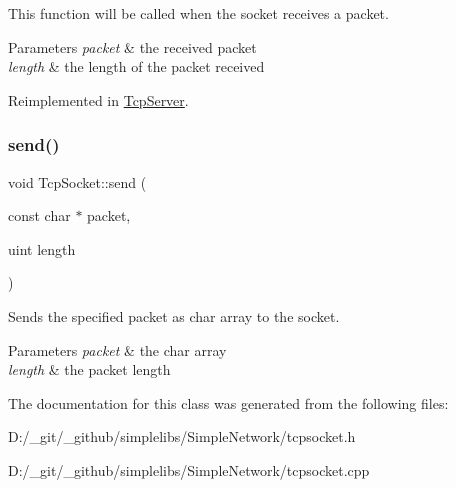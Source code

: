 This function will be called when the socket receives a packet. 


\begin{DoxyParams}{Parameters}
{\em packet} & the received packet \\
\hline
{\em length} & the length of the packet received \\
\hline
\end{DoxyParams}


Reimplemented in \mbox{\hyperlink{class_tcp_server_afb492b671a8960d2969f22a3c9408ba7}{Tcp\+Server}}.

\mbox{\label{class_tcp_socket_a9e62b6ef15b2e10d2aa8316439651cd3}} 
\subsubsection{\texorpdfstring{send()}{send()}}
{\footnotesize\ttfamily void Tcp\+Socket\+::send (\begin{DoxyParamCaption}\item[{const char $\ast$}]{packet,  }\item[{uint}]{length }\end{DoxyParamCaption})}



Sends the specified packet as char array to the socket. 


\begin{DoxyParams}{Parameters}
{\em packet} & the char array \\
\hline
{\em length} & the packet length \\
\hline
\end{DoxyParams}


The documentation for this class was generated from the following files\+:\begin{DoxyCompactItemize}
\item 
D\+:/\+\_\+git/\+\_\+github/simplelibs/\+Simple\+Network/tcpsocket.\+h\item 
D\+:/\+\_\+git/\+\_\+github/simplelibs/\+Simple\+Network/tcpsocket.\+cpp\end{DoxyCompactItemize}
